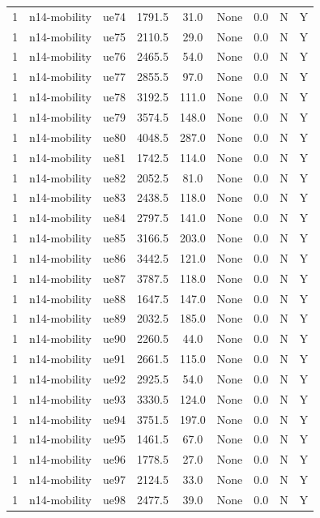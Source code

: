 \begin{table}[ht]
\begin{tabular}{|c|c|c|c|c|c|c|c|c|}
1 & n14-mobility & ue74 & 1791.5 & 31.0 & None & 0.0 & N & Y \\
1 & n14-mobility & ue75 & 2110.5 & 29.0 & None & 0.0 & N & Y \\
1 & n14-mobility & ue76 & 2465.5 & 54.0 & None & 0.0 & N & Y \\
1 & n14-mobility & ue77 & 2855.5 & 97.0 & None & 0.0 & N & Y \\
1 & n14-mobility & ue78 & 3192.5 & 111.0 & None & 0.0 & N & Y \\
1 & n14-mobility & ue79 & 3574.5 & 148.0 & None & 0.0 & N & Y \\
1 & n14-mobility & ue80 & 4048.5 & 287.0 & None & 0.0 & N & Y \\
1 & n14-mobility & ue81 & 1742.5 & 114.0 & None & 0.0 & N & Y \\
1 & n14-mobility & ue82 & 2052.5 & 81.0 & None & 0.0 & N & Y \\
1 & n14-mobility & ue83 & 2438.5 & 118.0 & None & 0.0 & N & Y \\
1 & n14-mobility & ue84 & 2797.5 & 141.0 & None & 0.0 & N & Y \\
1 & n14-mobility & ue85 & 3166.5 & 203.0 & None & 0.0 & N & Y \\
1 & n14-mobility & ue86 & 3442.5 & 121.0 & None & 0.0 & N & Y \\
1 & n14-mobility & ue87 & 3787.5 & 118.0 & None & 0.0 & N & Y \\
1 & n14-mobility & ue88 & 1647.5 & 147.0 & None & 0.0 & N & Y \\
1 & n14-mobility & ue89 & 2032.5 & 185.0 & None & 0.0 & N & Y \\
1 & n14-mobility & ue90 & 2260.5 & 44.0 & None & 0.0 & N & Y \\
1 & n14-mobility & ue91 & 2661.5 & 115.0 & None & 0.0 & N & Y \\
1 & n14-mobility & ue92 & 2925.5 & 54.0 & None & 0.0 & N & Y \\
1 & n14-mobility & ue93 & 3330.5 & 124.0 & None & 0.0 & N & Y \\
1 & n14-mobility & ue94 & 3751.5 & 197.0 & None & 0.0 & N & Y \\
1 & n14-mobility & ue95 & 1461.5 & 67.0 & None & 0.0 & N & Y \\
1 & n14-mobility & ue96 & 1778.5 & 27.0 & None & 0.0 & N & Y \\
1 & n14-mobility & ue97 & 2124.5 & 33.0 & None & 0.0 & N & Y \\
1 & n14-mobility & ue98 & 2477.5 & 39.0 & None & 0.0 & N & Y \\

\end{tabular}
\end{table}
